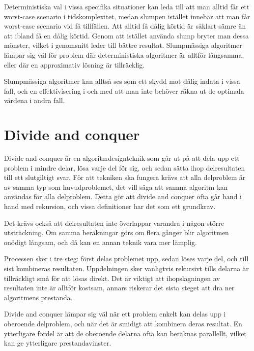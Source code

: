\documentclass[a5paper,10pt,oneside]{article}
\begin{document}
Deterministiska val i vissa specifika situationer kan leda till att man alltid får ett worst-case scenario 
i tidskomplexitet, medan slumpen istället innebär att man får worst-case scenario vid få tillfällen.
Att alltid få dålig körtid är såklart sämre än att ibland få en dålig körtid.
Genom att istället använda slump bryter man dessa mönster, vilket i genomsnitt leder till bättre resultat.
Slumpmässiga algoritmer lämpar sig väl för problem där deterministiska algoritmer är alltför långsamma, 
eller där en approximativ lösning är tillräcklig.

Slumpmässiga algoritmer kan alltså ses som ett skydd mot dålig indata i vissa fall, och en effektivisering 
i och med att man inte behöver räkna ut de optimala värdena i andra fall.
\section{Divide and conquer}
Divide and conquer är en algoritmdesignteknik som går ut på att dela upp ett problem i mindre delar, 
lösa varje del för sig, och sedan sätta ihop delresultaten till ett slutgiltigt svar.
För att tekniken ska fungera krävs att alla delproblem är av samma typ som huvudproblemet, 
det vill säga att samma algoritm kan användas för alla delproblem. 
Detta gör att divide and conquer ofta går hand i hand med rekursion, och vissa definitioner har det som ett grundkrav.

Det krävs också att delresultaten inte överlappar varandra i någon större utsträckning. 
Om samma beräkningar görs om flera gånger blir algoritmen onödigt långsam, 
och då kan en annan teknik vara mer lämplig.

Processen sker i tre steg: först delas problemet upp, sedan löses varje del, 
och till sist kombineras resultaten. Uppdelningen sker vanligtvis rekursivt tills 
delarna är tillräckligt små för att lösas direkt. 
Det är viktigt att ihopslagningen av resultaten inte är alltför kostsam, 
annars riskerar det sista steget att dra ner algoritmens prestanda.

Divide and conquer lämpar sig väl när ett problem enkelt kan delas upp i oberoende delproblem, 
och när det är smidigt att kombinera deras resultat. 
En ytterligare fördel är att de oberoende delarna ofta kan beräknas parallellt, 
vilket kan ge ytterligare prestandavinster.
\end{document}
